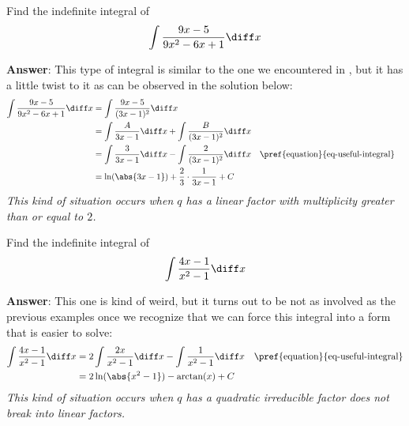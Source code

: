 \begin{exm}\label{exm-integration-rational-function:3}
	Find the indefinite integral of
	\begin{equation*}
		\int \frac{9x-5}{9x^2-6x+1} \diff x
	\end{equation*}
	\begin{flushleft}
		\textbf{Answer}: This type of integral is similar to the one we encountered
		in , but it has a little
		twist to it as can be observed in the solution below:
		\begin{align*}
			\int \frac{9x-5}{9x^2-6x+1} \diff x
			 & = \int \frac{9x-5}{(3x-1)^2} \diff x                                                                            \\
			 & = \int \frac{A}{3x-1} \diff x + \int \frac{B}{(3x-1)^2} \diff x                                                 \\
			 & = \int \frac{3}{3x-1} \diff x - \int \frac{2}{(3x-1)^2} \diff x &  & \text{\pref{equation}{eq-useful-integral}} \\
			 & = \ln(\abs{3x-1}) + \frac{2}{3}\cdot\frac{1}{3x-1} + C
		\end{align*}
		\textit{This kind of situation occurs when $q$ has a linear factor with
			multiplicity greater than or equal to $2$.}
	\end{flushleft}
\end{exm}

\begin{exm}\label{exm-integration-rational-function:4}
	Find the indefinite integral of
	\begin{equation*}
		\int \frac{4x-1}{x^2-1} \diff x
	\end{equation*}
	\begin{flushleft}
		\textbf{Answer}: This one is kind of weird, but it turns out to be not as
		involved as the previous examples once we recognize that we can force this
		integral into a form that is easier to solve:
		\begin{align*}
			\int \frac{4x-1}{x^2-1} \diff x
			 & = 2 \int \frac{2x}{x^2-1} \diff x - \int \frac{1}{x^2-1} \diff x &  & \text{\pref{equation}{eq-useful-integral}} \\
			 & = 2\ln(\abs{x^2-1}) - \arctan(x) + C
		\end{align*}
		\textit{This kind of situation occurs when $q$ has a quadratic irreducible
			factor does not break into linear factors.}
	\end{flushleft}
\end{exm}

